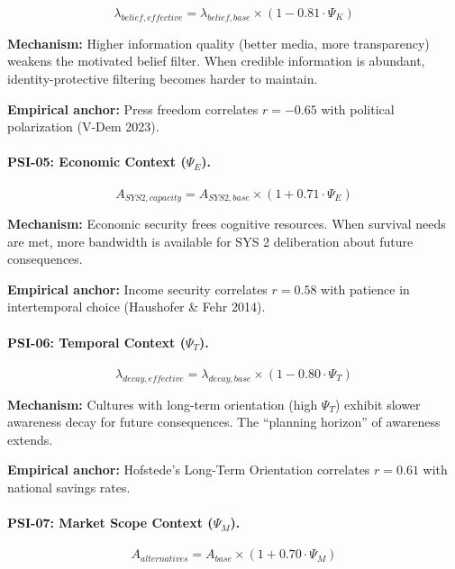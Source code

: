 \begin{equation}
\lambda_{belief,effective} = \lambda_{belief,base} \times (1 - 0.81 \cdot \Psi_K)
\end{equation}

\textbf{Mechanism:} Higher information quality (better media, more transparency) weakens the motivated belief filter. When credible information is abundant, identity-protective filtering becomes harder to maintain.

\textbf{Empirical anchor:} Press freedom correlates $r = -0.65$ with political polarization (V-Dem 2023).

\paragraph{PSI-05: Economic Context ($\Psi_E$).}

\begin{equation}
A_{SYS2,capacity} = A_{SYS2,base} \times (1 + 0.71 \cdot \Psi_E)
\end{equation}

\textbf{Mechanism:} Economic security frees cognitive resources. When survival needs are met, more bandwidth is available for SYS 2 deliberation about future consequences.

\textbf{Empirical anchor:} Income security correlates $r = 0.58$ with patience in intertemporal choice (Haushofer \& Fehr 2014).

\paragraph{PSI-06: Temporal Context ($\Psi_T$).}

\begin{equation}
\lambda_{decay,effective} = \lambda_{decay,base} \times (1 - 0.80 \cdot \Psi_T)
\end{equation}

\textbf{Mechanism:} Cultures with long-term orientation (high $\Psi_T$) exhibit slower awareness decay for future consequences. The ``planning horizon'' of awareness extends.

\textbf{Empirical anchor:} Hofstede's Long-Term Orientation correlates $r = 0.61$ with national savings rates.

\paragraph{PSI-07: Market Scope Context ($\Psi_M$).}

\begin{equation}
A_{alternatives} = A_{base} \times (1 + 0.70 \cdot \Psi_M)
\end{equation}


